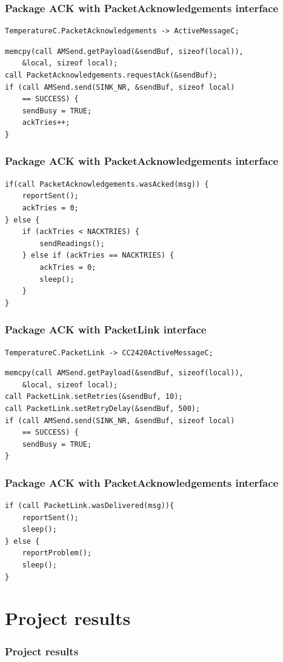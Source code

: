 \documentclass{beamer}
\begin{document}
\begin{frame}[fragile]
\frametitle{Package ACK with PacketAcknowledgements interface}
\begin{lstlisting}[caption={TemperatureAppC.nc}]
 TemperatureC.PacketAcknowledgements -> ActiveMessageC;
\end{lstlisting}


\begin{lstlisting}[caption={TemperatureC.nc $\rightarrow$ sendReadings()}]
memcpy(call AMSend.getPayload(&sendBuf, sizeof(local)),
    &local, sizeof local);
call PacketAcknowledgements.requestAck(&sendBuf);
if (call AMSend.send(SINK_NR, &sendBuf, sizeof local)
    == SUCCESS) {
    sendBusy = TRUE;
    ackTries++;
}
\end{lstlisting}

\end{frame}

\begin{frame}[fragile]
\frametitle{Package ACK with PacketAcknowledgements interface}

\begin{lstlisting}[caption={TemperatureC.nc $\rightarrow$ AMSend.sendDone()}]
if(call PacketAcknowledgements.wasAcked(msg)) {
    reportSent();
    ackTries = 0;
} else {
    if (ackTries < NACKTRIES) {
        sendReadings();
    } else if (ackTries == NACKTRIES) {
        ackTries = 0;
        sleep();
    }
}
\end{lstlisting}

\end{frame}

\begin{frame}[fragile]
\frametitle{Package ACK with PacketLink interface}
\begin{lstlisting}[caption={TemperatureAppC.nc}]
TemperatureC.PacketLink -> CC2420ActiveMessageC;
\end{lstlisting}

\begin{lstlisting}[caption={TemperatureC.nc $\rightarrow$ sendReadings()}]
memcpy(call AMSend.getPayload(&sendBuf, sizeof(local)),
    &local, sizeof local);
call PacketLink.setRetries(&sendBuf, 10);
call PacketLink.setRetryDelay(&sendBuf, 500);
if (call AMSend.send(SINK_NR, &sendBuf, sizeof local)
    == SUCCESS) {
    sendBusy = TRUE;
}
\end{lstlisting}

\end{frame}

\begin{frame}[fragile]
\frametitle{Package ACK with PacketAcknowledgements interface}

\begin{lstlisting}[caption={TemperatureC.nc $\rightarrow$ AMSend.sendDone()}]
if (call PacketLink.wasDelivered(msg)){
    reportSent();
    sleep();
} else {
    reportProblem();
    sleep();
}
\end{lstlisting}

\end{frame}


\section{Project results}

\begin{frame}
\frametitle{Project results}
 
\end{frame}
\end{document}
